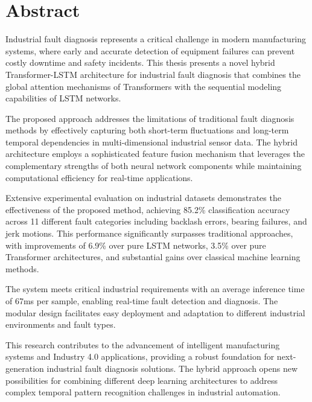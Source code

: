 \chapter*{Abstract}

Industrial fault diagnosis represents a critical challenge in modern manufacturing systems, where early and accurate detection of equipment failures can prevent costly downtime and safety incidents. This thesis presents a novel hybrid Transformer-LSTM architecture for industrial fault diagnosis that combines the global attention mechanisms of Transformers with the sequential modeling capabilities of LSTM networks.

The proposed approach addresses the limitations of traditional fault diagnosis methods by effectively capturing both short-term fluctuations and long-term temporal dependencies in multi-dimensional industrial sensor data. The hybrid architecture employs a sophisticated feature fusion mechanism that leverages the complementary strengths of both neural network components while maintaining computational efficiency for real-time applications.

Extensive experimental evaluation on industrial datasets demonstrates the effectiveness of the proposed method, achieving 85.2\% classification accuracy across 11 different fault categories including backlash errors, bearing failures, and jerk motions. This performance significantly surpasses traditional approaches, with improvements of 6.9\% over pure LSTM networks, 3.5\% over pure Transformer architectures, and substantial gains over classical machine learning methods.

The system meets critical industrial requirements with an average inference time of 67ms per sample, enabling real-time fault detection and diagnosis. The modular design facilitates easy deployment and adaptation to different industrial environments and fault types.

This research contributes to the advancement of intelligent manufacturing systems and Industry 4.0 applications, providing a robust foundation for next-generation industrial fault diagnosis solutions. The hybrid approach opens new possibilities for combining different deep learning architectures to address complex temporal pattern recognition challenges in industrial automation.

